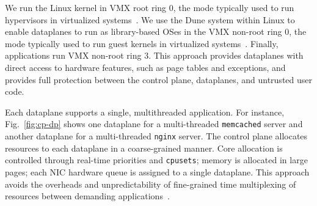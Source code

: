 We run the Linux kernel in VMX root ring 0, the mode typically used to
run hypervisors in virtualized
systems~\cite{DBLP:journals/computer/UhligNRSMABKLS05}. We use the
Dune system within Linux to enable dataplanes to run as library-based
OSes in the VMX non-root ring 0, the mode typically used to run guest
kernels in virtualized systems~\cite{belay2012dune}. %
Finally, applications run VMX non-root ring 3. This
approach provides dataplanes with direct access to hardware features,
such as page tables and exceptions, and provides full protection
between the control plane, dataplanes, and untrusted user
code. %




Each \ix dataplane supports a single, multithreaded
application. For instance, Fig.~\ref{fig:cp-dp} shows one dataplane
for a multi-threaded \texttt{memcached} server and another dataplane
for a multi-threaded \texttt{nginx} server. The control plane allocates
resources to each dataplane in a coarse-grained manner. Core allocation
is controlled through real-time priorities and \texttt{cpusets};
memory is allocated in large pages; each NIC hardware queue is
assigned to a single dataplane. This approach avoids the overheads and
unpredictability of fine-grained time multiplexing of resources between
demanding applications~\cite{Leverich:RHSU:2014}.

